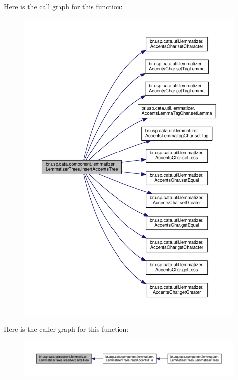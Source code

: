 Here is the call graph for this function\+:\nopagebreak
\begin{figure}[H]
\begin{center}
\leavevmode
\includegraphics[width=350pt]{classbr_1_1usp_1_1cata_1_1component_1_1lemmatizer_1_1_lemmatizer_trees_a74231a5dc7bba4243a22e883d95e110f_cgraph}
\end{center}
\end{figure}




Here is the caller graph for this function\+:\nopagebreak
\begin{figure}[H]
\begin{center}
\leavevmode
\includegraphics[width=350pt]{classbr_1_1usp_1_1cata_1_1component_1_1lemmatizer_1_1_lemmatizer_trees_a74231a5dc7bba4243a22e883d95e110f_icgraph}
\end{center}
\end{figure}


